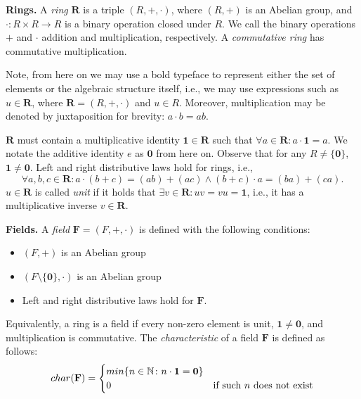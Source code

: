 \textbf{Rings.} A \emph{ring} $\mathbf R$ is a triple $(R,+,\cdot)$, 
where $(R, +)$ is an Abelian group, and $\cdot \colon R \times R \to R$ 
is a binary operation closed under $R$. We call the binary operations $+$ and $\cdot$ 
addition and multiplication, respectively. A \emph{commutative ring} has commutative multiplication. 

Note, from here on we may use a bold typeface to represent either the set of elements 
or the algebraic structure itself, i.e., 
we may use expressions such as $u \in \mathbf{R}$, where $\mathbf{R} = (R,+,\cdot)$ and $u \in R$. 
Moreover, multiplication may be denoted by juxtaposition for brevity: $a\cdot b = ab$. 

$\mathbf{R}$ must contain a multiplicative identity 
$\mathbf{1} \in \mathbf{R}$ such that $\forall a \in \mathbf{R} \colon a \cdot \mathbf{1} = a$. 
We notate the additive identity $e$ 
as $\mathbf{0}$ from here on. 
Observe that for any $R \neq \{\mathbf{0}\}$, $\mathbf{1} \neq \mathbf{0}$. 
Left and right distributive laws hold for rings, i.e., 
\[
  \forall a, b, c \in \mathbf{R} \colon a \cdot (b + c) = (ab) + (ac) \land (b + c) \cdot a = (ba) + (ca).
\]
$u \in \mathbf{R}$ is called \emph{unit} if it holds 
that $\exists v \in \mathbf{R} \colon uv = vu = \mathbf{1}$, 
i.e., it has a multiplicative inverse $v \in \mathbf{R}$.

\textbf{Fields.} A \emph{field} $\mathbf{F} = (F, +, \cdot)$ is defined with the following conditions:
\begin{itemize}
  \item $(F, +)$ is an Abelian group
  \item $(F\setminus \{\mathbf{0}\}, \cdot )$ is an Abelian group
  \item Left and right distributive laws hold for $\mathbf{F}$.
\end{itemize}

Equivalently, a ring is a field if every non-zero element is unit, $\mathbf{1} \neq \mathbf{0}$, 
and multiplication is commutative. 
The \emph{characteristic} of a field $\mathbf{F}$ is defined as follows:
\begin{equation}
  char(\mathbf{F}) =
    \begin{cases}
      min\{n \in \mathbb N \colon n \cdot \mathbf{1} = \mathbf{0} \}\\
      0 & \text{if such $n$ does not exist}\\
    \end{cases}       
\end{equation}

